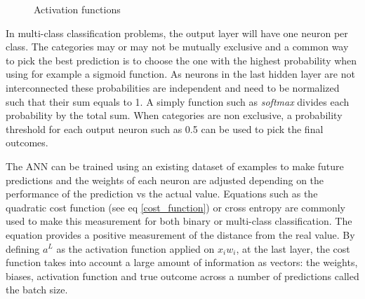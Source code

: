 \documentclass[proposal]{softeng}
\begin{document}
\begin{figure}
    \centering
    \caption{Activation functions \cite{activationfunction}}
    \label{activation_funtions}
\end{figure}

In multi-class classification problems, the output layer will have one neuron per class. The categories may or may not be mutually exclusive and a common way to pick the best prediction is to choose the one with the highest probability when using for example a sigmoid function. As neurons in the last hidden layer are not interconnected these probabilities are independent and need to be normalized such that their sum equals to 1. A simply function such as \textit{softmax} divides each probability by the total sum. When categories are non exclusive, a probability threshold for each output neuron such as 0.5 can be used to pick the final outcomes.

The ANN can be trained using an existing dataset of examples to make future predictions and the weights of each neuron are adjusted depending on the performance of the prediction vs the actual value. Equations such as the quadratic cost function (see eq \ref{cost_function}) or cross entropy are commonly used to make this measurement for both binary or multi-class classification. The equation provides a positive measurement of the distance from the real value. By defining \( a^L  \) as the activation function applied on \( {x_{i}} {w_{i}} \), at the last layer, the cost function takes into account a large amount of information as vectors: the weights, biases, activation function and true outcome across a number of predictions called the batch size.
\end{document}
